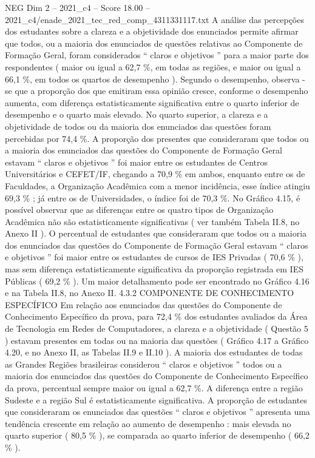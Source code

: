 \begin{textsample}{NEG Dim 2 – 2021\_c4 – Score 18.00 – 2021\_c4/enade\_2021\_tec\_red\_comp\_4311331117.txt}
A análise das percepções dos estudantes sobre a clareza e a objetividade dos enunciados permite afirmar que todos, ou a maioria dos enunciados de questões relativas ao Componente de Formação Geral, foram considerados “ claros e objetivos ” para a maior parte dos respondentes ( maior ou igual a 62,7 \%, em todas as regiões, e maior ou igual a 66,1 \%, em todos os quartos de desempenho ).
Segundo o desempenho, observa -se que a proporção dos que emitiram essa opinião cresce, conforme o desempenho aumenta, com diferença estatisticamente significativa entre o quarto inferior de desempenho e o quarto mais elevado.
No quarto superior, a clareza e a objetividade de todos ou da maioria dos enunciados das questões foram percebidas por 74,4 \%.
A proporção dos presentes que consideraram que todos ou a maioria dos enunciados das questões do Componente de Formação Geral estavam “ claros e objetivos ” foi maior entre os estudantes de Centros Universitários e CEFET/IF, chegando a 70,9 \% em ambos, enquanto entre os de Faculdades, a Organização Acadêmica com a menor incidência, esse índice atingiu 69,3 \% ; já entre os de Universidades, o índice foi de 70,3 \%.
No Gráfico 4.15, é possível observar que as diferenças entre os quatro tipos de Organização Acadêmica não são estatisticamente significativas ( ver também Tabela II.8, no Anexo II ).
O percentual de estudantes que consideraram que todos ou a maioria dos enunciados das questões do Componente de Formação Geral estavam “ claros e objetivos ” foi maior entre os estudantes de cursos de IES Privadas ( 70,6 \% ), mas sem diferença estatisticamente significativa da proporção registrada em IES Públicas ( 69,2 \% ).
Um maior detalhamento pode ser encontrado no Gráfico 4.16 e na Tabela II.8, no Anexo II. 4.3.2 COMPONENTE DE CONHECIMENTO ESPECÍFICO Em relação aos enunciados das questões do Componente de Conhecimento Específico da prova, para 72,4 \% dos estudantes avaliados da Área de Tecnologia em Redes de Computadores, a clareza e a objetividade ( Questão 5 ) estavam presentes em todas ou na maioria das questões ( Gráfico 4.17 a Gráfico 4.20, e no Anexo II, as Tabelas II.9 e II.10 ).
A maioria dos estudantes de todas as Grandes Regiões brasileiras considerou “ claros e objetivos ” todos ou a maioria dos enunciados das questões do Componente de Conhecimento Específico da prova, percentual sempre maior ou igual a 62,7 \%.
A diferença entre a região Sudeste e a região Sul é estatisticamente significativa.
A proporção de estudantes que consideraram os enunciados das questões “ claros e objetivos ” apresenta uma tendência crescente em relação ao aumento de desempenho : mais elevada no quarto superior ( 80,5 \% ), se comparada ao quarto inferior de desempenho ( 66,2 \% ).

\end{textsample}
